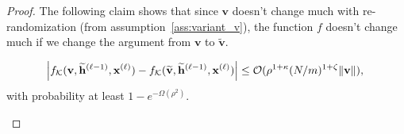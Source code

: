 \begin{proof}
	The following claim shows that since $\mathbf{v}$ doesn't change much with re-randomization (from assumption~\ref{ass:variant_v}), the function $f$ doesn't change much if we change the argument from $\mathbf{v}$ to $\widetilde{\mathbf{v}}$.  
	\begin{claim}\label{claim:ffv}
		\begin{equation*}
			\abs{f_{\mathcal{K}}(\mathbf{v}, \widetilde{\mathbf{h}}^{(\ell-1)}, \mathbf{x}^{(\ell)}) - f_{\mathcal{K}}(\widetilde{\mathbf{v}}, \widetilde{\mathbf{h}}^{(\ell-1)}, \mathbf{x}^{(\ell)}) } \le \mathcal{O}(\rho^{1 + \kappa} (N/m)^{1+\zeta} \norm{\mathbf{v}}),
		\end{equation*}
		with probability at least $1 - e^{-\Omega(\rho^2)}$.
	\end{claim}
	

\end{proof}
